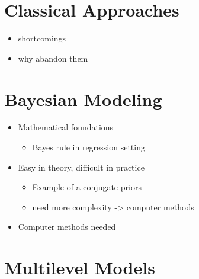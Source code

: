 \documentclass[
]{article}
\providecommand{\tightlist}{%
  \setlength{\itemsep}{0pt}\setlength{\parskip}{0pt}}
\begin{document}
\hypertarget{ch3}{%
\section{Classical Approaches}\label{ch3}}

\begin{itemize}
\tightlist
\item
  shortcomings
\item
  why abandon them
\end{itemize}

\hypertarget{ch4}{%
\section{Bayesian Modeling}\label{ch4}}

\begin{itemize}
\tightlist
\item
  Mathematical foundations

  \begin{itemize}
  \tightlist
  \item
    Bayes rule in regression setting
  \end{itemize}
\item
  Easy in theory, difficult in practice

  \begin{itemize}
  \tightlist
  \item
    Example of a conjugate priors
  \item
    need more complexity -\textgreater{} computer methods
  \end{itemize}
\item
  Computer methods needed
\end{itemize}

\hypertarget{ch5}{%
\section{Multilevel Models}\label{ch5}}
\end{document}
